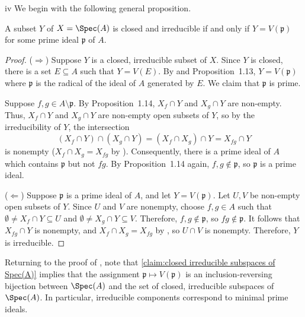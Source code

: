 \begin{partsolution}{iv}
We begin with the following general proposition.

\begin{claim}
\label{claim:closed irreducible subspaces of Spec(A)}
A subset \(Y\) of \(X = \Spec(A)\) is closed and irreducible if and only if \(Y = V(\mathfrak{p})\) for some prime ideal \(\mathfrak{p}\) of \(A\).
\end{claim}

\begin{proof}
(\(\Rightarrow\))
Suppose \(Y\) is a closed, irreducible subset of \(X\).
Since \(Y\) is closed, there is a set \(E \subseteq A\) such that \(Y = V(E)\).
By  and Proposition~1.13, \(Y = V(\mathfrak{p})\) where \(\mathfrak{p}\) is the radical of the ideal of \(A\) generated by \(E\).
We claim that \(\mathfrak{p}\) is prime.

Suppose \(f, g \in A \setminus \mathfrak{p}\).
By Proposition~1.14, \(X_f \cap Y\) and \(X_g \cap Y\) are non-empty.
Thus, \(X_f \cap Y\) and \(X_g \cap Y\) are non-empty open subsets of \(Y\), so by the irreducibility of \(Y\), the intersection
\begin{equation*}
(X_f \cap Y) \cap (X_g \cap Y)
= (X_f \cap X_g) \cap Y
= X_{f g} \cap Y
\end{equation*}
is nonempty (\(X_f \cap X_g = X_{f g}\) by ).
Consequently, there is a prime ideal of \(A\) which contains \(\mathfrak{p}\) but not \(f g\).
By Proposition~1.14 again, \(f, g \notin \mathfrak{p}\), so \(\mathfrak{p}\) is a prime ideal.

(\(\Leftarrow\))
Suppose \(\mathfrak{p}\) is a prime ideal of \(A\), and let \(Y = V(\mathfrak{p})\).
Let \(U, V\) be non-empty open subsets of \(Y\).
Since \(U\) and \(V\) are nonempty, choose \(f, g \in A\) such that \(\emptyset \neq X_f \cap Y \subseteq U\) and \(\emptyset \neq X_g \cap Y \subseteq V\).
Therefore, \(f, g \notin \mathfrak{p}\), so \(f g \notin \mathfrak{p}\).
It follows that \(X_{f g} \cap Y\) is nonempty, and \(X_f \cap X_g = X_{f g}\) by , so \(U \cap V\) is nonempty.
Therefore, \(Y\) is irreducible.
\end{proof}

Returning to the proof of , note that \autoref{claim:closed irreducible subspaces of Spec(A)} implies that the assignment \(\mathfrak{p} \mapsto V(\mathfrak{p})\) is an inclusion-reversing bijection between \(\Spec(A)\) and the set of closed, irreducible subspaces of \(\Spec(A)\).
In particular, irreducible components correspond to minimal prime ideals.
\end{partsolution}